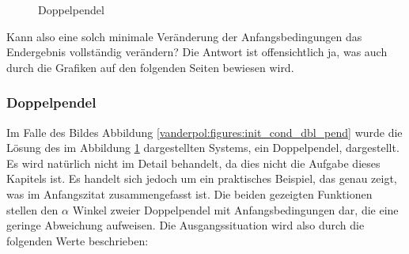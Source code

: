\begin{figure}
\centering
{}
\caption{Doppelpendel\label{vanderpol:figures:doublependulum}}
%
\end{figure}
Kann also eine solch minimale Veränderung der Anfangsbedingungen das Endergebnis vollständig verändern? Die Antwort ist offensichtlich ja, was auch durch die Grafiken auf den folgenden Seiten bewiesen wird.
\subsubsection{Doppelpendel \cite{vanderpol:bibdopperlpendel}}
\label{vanderpol:subsubsection:doppelpendel}
Im Falle des Bildes Abbildung \ref{vanderpol:figures:init_cond_dbl_pend} wurde die Lösung des im Abbildung \ref{vanderpol:figures:doublependulum} dargestellten Systems, ein Doppelpendel, dargestellt. Es wird natürlich nicht im Detail behandelt, da dies nicht die Aufgabe dieses Kapitels ist. Es handelt sich jedoch um ein praktisches Beispiel, das genau zeigt, was im Anfangszitat zusammengefasst ist. Die beiden gezeigten Funktionen stellen den $\alpha$ Winkel zweier Doppelpendel mit Anfangsbedingungen dar, die eine geringe Abweichung aufweisen. Die Ausgangssituation wird also durch die folgenden Werte beschrieben:

